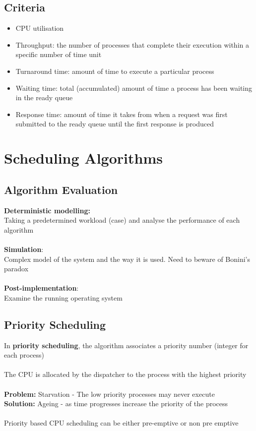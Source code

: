 \documentclass{article}[18pt]
\begin{document}
\subsection{Criteria}
\begin{itemize}
\item CPU utilisation
\item Throughput: the number of processes that complete their execution within a specific number of time unit
\item Turnaround time: amount of time to execute a particular process
\item Waiting time: total (accumulated) amount of time a process has been waiting in the ready queue
\item Response time: amount of time it takes from when a request was first submitted to the ready queue until the first response is produced
\end{itemize}
\section{Scheduling Algorithms}
\subsection{Algorithm Evaluation}
\textbf{Deterministic modelling:}\\
Taking a predetermined workload (case) and analyse the performance of each algorithm\\
\\
\textbf{Simulation}:\\
Complex model of the system and the way it is used. Need to beware of Bonini's paradox\\
\\
\textbf{Post-implementation}:\\
Examine the running operating system
\subsection{Priority Scheduling}
In \textbf{priority scheduling}, the algorithm associates a priority number (integer for each process)\\
\\
The CPU is allocated by the dispatcher to the process with the highest priority\\
\\
\textbf{Problem:} Starvation - The low priority processes may never execute\\
\textbf{Solution:} Ageing - as time progresses increase the priority of the process\\
\\
Priority based CPU scheduling can be either pre-emptive or non pre emptive
\end{document}
